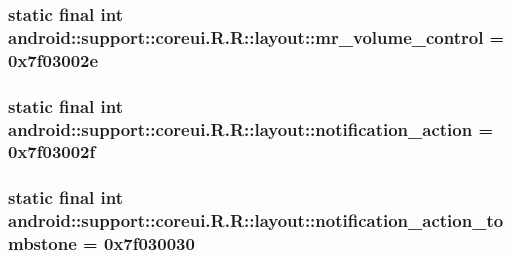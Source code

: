 \hypertarget{classandroid_1_1support_1_1coreui_1_1_r_1_1layout_45ad2e823f2bc2cb78c510baf3223c7b}{
\subsubsection[{mr\_\-volume\_\-control}]{\setlength{\rightskip}{0pt plus 5cm}static final int android::support::coreui.R.R::layout::mr\_\-volume\_\-control = 0x7f03002e}}
\label{classandroid_1_1support_1_1coreui_1_1_r_1_1layout_45ad2e823f2bc2cb78c510baf3223c7b}


\hypertarget{classandroid_1_1support_1_1coreui_1_1_r_1_1layout_6cd242e8a2212139450d1d14377b37bc}{
\subsubsection[{notification\_\-action}]{\setlength{\rightskip}{0pt plus 5cm}static final int android::support::coreui.R.R::layout::notification\_\-action = 0x7f03002f}}
\label{classandroid_1_1support_1_1coreui_1_1_r_1_1layout_6cd242e8a2212139450d1d14377b37bc}


\hypertarget{classandroid_1_1support_1_1coreui_1_1_r_1_1layout_3ee9120596ab23464651618e9c522c9d}{
\subsubsection[{notification\_\-action\_\-tombstone}]{\setlength{\rightskip}{0pt plus 5cm}static final int android::support::coreui.R.R::layout::notification\_\-action\_\-tombstone = 0x7f030030}}
\label{classandroid_1_1support_1_1coreui_1_1_r_1_1layout_3ee9120596ab23464651618e9c522c9d}


